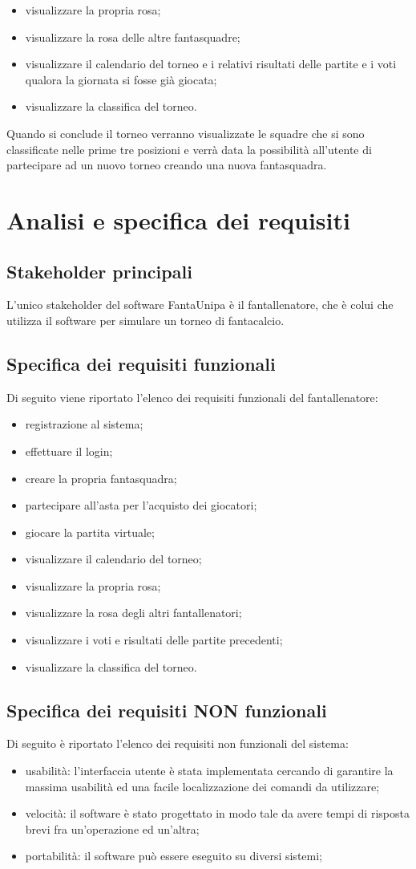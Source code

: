 \documentclass[12pt,a4paper]{article}
\begin{document}
\begin{itemize}
\item visualizzare la propria rosa;
\item visualizzare la rosa delle altre fantasquadre;
\item visualizzare il calendario del torneo e i relativi risultati delle partite e i voti qualora la giornata si fosse già giocata;
\item visualizzare la classifica del torneo.
\end{itemize} 
Quando si conclude il torneo verranno visualizzate le squadre che si sono classificate nelle prime tre posizioni e verrà data la possibilità all'utente di partecipare ad un nuovo torneo creando una nuova fantasquadra.
\section{Analisi e specifica dei requisiti}
\subsection{Stakeholder principali}
L'unico stakeholder del software FantaUnipa è il fantallenatore, che è colui che utilizza il software per simulare un torneo di fantacalcio. 
\subsection{Specifica dei requisiti funzionali}
Di seguito viene riportato l'elenco dei requisiti funzionali del fantallenatore:
\begin{itemize}
\item registrazione al sistema;
\item effettuare il login;
\item creare la propria fantasquadra;
\item partecipare all'asta per l'acquisto dei giocatori;
\item giocare la partita virtuale;
\item visualizzare il calendario del torneo;
\item visualizzare la propria rosa;
\item visualizzare la rosa degli altri fantallenatori;
\item visualizzare i voti e risultati delle partite precedenti;
\item visualizzare la classifica del torneo.
\end{itemize}
\subsection{Specifica dei requisiti NON funzionali}
Di seguito è riportato l'elenco dei requisiti non funzionali del sistema:
\begin{itemize}
\item usabilità: l'interfaccia utente è stata implementata cercando di garantire la massima usabilità ed una facile localizzazione dei comandi da utilizzare;
\item velocità: il software è stato progettato in modo tale da avere tempi di risposta brevi fra un'operazione ed un'altra;
\item portabilità: il software può essere eseguito su diversi sistemi;
\end{itemize}
\end{document}
